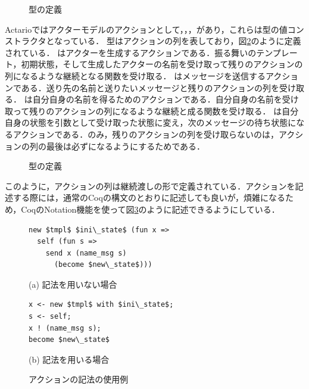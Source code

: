 \begin{figure}
  
  \caption{型の定義}\label{code:overview:behavior}
\end{figure}

Actarioではアクターモデルのアクションとして，，，があり，これらは型の値コンストラクタとなっている．
型はアクションの列を表しており，図\ref{code:overview:actions}のように定義されている．
はアクターを生成するアクションである．振る舞いのテンプレート，初期状態，そして生成したアクターの名前を受け取って残りのアクションの列になるような継続となる関数を受け取る．
はメッセージを送信するアクションである．送り先の名前と送りたいメッセージと残りのアクションの列を受け取る．
は自分自身の名前を得るためのアクションである．自分自身の名前を受け取って残りのアクションの列になるような継続と成る関数を受け取る．
は自分自身の状態を引数として受け取った状態に変え，次のメッセージの待ち状態になるアクションである．のみ，残りのアクションの列を受け取らないのは，アクションの列の最後は必ずになるようにするためである．

\begin{figure}
  
  \caption{型の定義}\label{code:overview:actions}
\end{figure}

このように，アクションの列は継続渡しの形で定義されている．アクションを記述する際には，通常のCoqの構文のとおりに記述しても良いが，煩雑になるため，CoqのNotation機能を使って図\ref{code:overview:notation}のように記述できるようにしている．

\begin{figure}\centering
\begin{minipage}{0.42\textwidth}\centering
\begin{lstlisting}[frame=single,numbers=none,xleftmargin=0pt]
new $tmpl$ $ini\_state$ (fun x =>
  self (fun s =>
    send x (name_msg s)
      (become $new\_state$)))
\end{lstlisting}
(a) 記法を用いない場合
\end{minipage}
\hspace*{3ex}
\begin{minipage}{0.42\textwidth}\centering
\begin{lstlisting}[frame=single,numbers=none,xleftmargin=0pt]
x <- new $tmpl$ with $ini\_state$;
s <- self;
x ! (name_msg s);
become $new\_state$
\end{lstlisting}
(b) 記法を用いる場合
\end{minipage}
\caption{アクションの記法の使用例}\label{code:overview:notation}
\end{figure}


